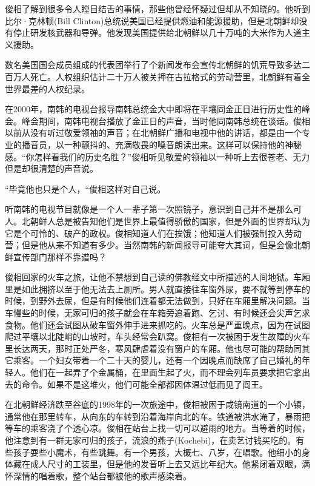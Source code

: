 俊相了解到很多令人瞠目结舌的事情，那些他曾经怀疑过但却从不知晓的。他听到比尔·克林顿(Bill Clinton)总统说美国已经提供燃油和能源援助，但是北朝鲜却没有停止研发核武器和导弹。他发现美国提供给北朝鲜以几十万吨的大米作为人道主义援助。

数名美国国会成员组成的代表团举行了个新闻发布会宣传北朝鲜的饥荒导致多达二百万人死亡。人权组织估计二十万人被关押在古拉格式的劳动营里，北朝鲜有着全世界最差的人权纪录。

在2000年，南韩的电视台报导南韩总统金大中即将在平壤同金正日进行历史性的峰会。峰会期间，南韩电视台播放了金正日的声音，当时他同南韩总统在谈话。俊相以前从没有听过敬爱领袖的声音；在北朝鲜广播和电视中他的讲话，都是由一个专业的播音员，以一种颤抖的、充满敬畏的嗓音朗读出来。这样可以保持他的神秘感。“你怎样看我们的历史名胜？”俊相听见敬爱的领袖以一种听上去很苍老、无力但是却很清楚的声音说。

“毕竟他也只是个人，“俊相这样对自己说。

听南韩的电视节目就像是一个人一辈子第一次照镜子，意识到自己并不是那么可人。北朝鲜人总是被告知他们是世界上最值得骄傲的国家，但是外面的世界却认为它是个可怜的、破产的政权。俊相知道人们在挨饿；他知道人们被强制投入劳动营；但是他从来不知道有多少。当然南韩的新闻报导可能夸大其词，但是会像北朝鲜宣传部门那样不靠谱吗？

俊相回家的火车之旅，让他不禁想到自己读的佛教经文中所描述的人间地狱。车厢里是如此拥挤以至于他无法去上厕所。男人就直接往车窗外尿，要不就等到停车的时候，到野外去尿，但是有时候他们连着都无法做到，只好在车厢里解决问题。当车慢些的时候，无家可归的孩子就会在车箱旁追着跑、乞讨、有时候还会尖声乞求食物。他们还会试图从破车窗外伸手进来抓吃的。火车总是严重晚点，因为在试图爬过平壤以北陡峭的山坡时，车头经常会趴窝。俊相有一次被困于发生故障的火车里长达两天，那时正处严冬，寒风肆虐着没有窗户的车厢。他也尽可能的帮助同其它乘客。一个妇女带着一个二十天的婴儿，还有一个因晚点而缺席了自己婚礼的年轻人。他们在一起弄了个金属桶，在里面生起了火，而不理会列车员要求把它拿出去的命令。如果不是这堆火，他们可能全部都因体温过低而见了阎王。

在北朝鲜经济跌至谷底的1998年的一次旅途中，俊相被困于咸镜南道的一个小镇，通常他在那里转车，从向东的车转到沿着海岸向北的车。铁道被洪水淹了，暴雨把等车的乘客浇了个透心凉。俊相在站台上找一切可以避雨的地方。当等着的时候，他注意到有一群无家可归的孩子，流浪的燕子(Kochebi)，在卖艺讨钱买吃的。有些孩子耍些小魔术，有些跳舞。有一个男孩，大概七、八岁，在唱歌。他细小的身体藏在成人尺寸的工装里，但是他的发音听上去又远比年纪大。他紧闭着双眼，满怀深情的唱着歌，整个站台都被他的歌声感染着。

